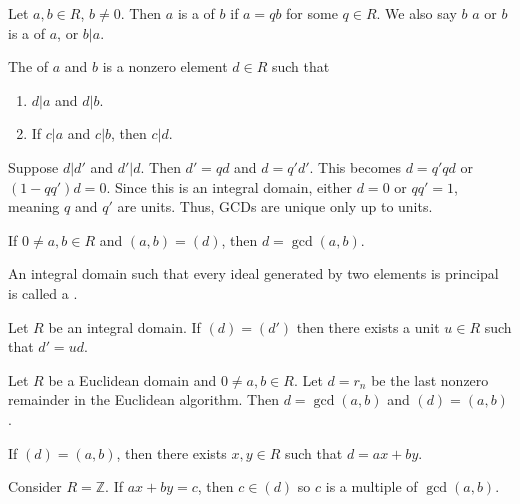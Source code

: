 \documentclass{mathnotes}
\begin{document}
\begin{defi}
  Let $a,b\in R$, $b\ne0$. Then $a$ is a  of $b$ if $a=qb$ for
  some $q\in R$. We also say $b$  $a$ or $b$ is a
   of $a$, or $b\vert a$.
\end{defi}

\begin{defi}
  The  of $a$ and $b$ is a nonzero element
  $d\in R$ such that
  \begin{enumerate}
    \item $d\vert a$ and $d\vert b$.
    \item If $c\vert a$ and $c\vert b$, then $c\vert d$.
  \end{enumerate}
\end{defi}

\begin{note}
  Suppose $d\vert d'$ and $d'\vert d$. Then $d'=qd$ and $d=q'd'$. This becomes
  $d=q'qd$ or $(1-qq')d=0$. Since this is an integral domain, either $d=0$ or
  $qq'=1$, meaning $q$ and $q'$ are units. Thus, GCDs are unique only up to
  units.
\end{note}

\begin{prop}
  If $0\ne a,b\in R$ and $(a,b)=(d)$, then $d=\gcd(a,b)$.
\end{prop}

\begin{defi}
  An integral domain such that every ideal generated by two elements is
  principal is called a .
\end{defi}

\begin{prop}
  Let $R$ be an integral domain. If $(d)=(d')$ then there exists a unit $u\in
  R$ such that $d'=ud$.
\end{prop}

\begin{prop}
  Let $R$ be a Euclidean domain and $0\ne a,b\in R$. Let $d=r_n$ be the last
  nonzero remainder in the Euclidean algorithm. Then $d=\gcd(a,b)$ and
  $(d)=(a,b)$.
\end{prop}

\begin{prop}
  If $(d)=(a,b)$, then there exists $x,y\in R$ such that $d=ax+by$.
\end{prop}

\begin{prop}
  Consider $R=\mathbb{Z}$. If $ax+by=c$, then $c\in(d)$ so $c$ is a multiple of
  $\gcd(a,b)$.
\end{prop}
\end{document}
